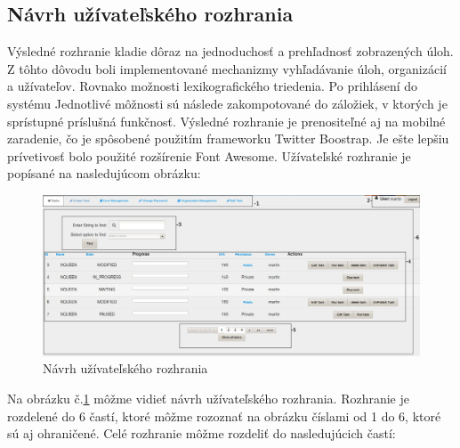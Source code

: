\subsection{Návrh užívateľského rozhrania}
Výsledné rozhranie kladie dôraz na jednoduchosť a prehľadnosť zobrazených úloh. Z tôhto dôvodu boli implementované mechanizmy vyhľadávanie úloh, organizácií a užívateľov. Rovnako možnosti lexikografického triedenia. Po prihlásení do systému Jednotlivé môžnosti sú následe zakompotované do záložiek, v ktorých je sprístupné príslušná funkčnosť. Výsledné rozhranie je prenositeľné aj na mobilné zaradenie, čo je spôsobené použitím frameworku Twitter Boostrap. Je ešte lepšiu prívetivosť bolo použité rozšírenie Font Awesome. Užívateľské rozhranie je popísané na nasledujúcom obrázku:
\begin{figure}[htb]

\begin{center}

\includegraphics[scale=0.5]{page_show.jpg} 
\caption{Návrh užívateľského rozhrania}
\label{rozhranie}

\end{center}

\end{figure}
Na obrázku č.\ref{rozhranie} môžme vidieť návrh užívateľského rozhrania. Rozhranie je rozdelené do 6 častí, ktoré môžme rozoznať na obrázku číslami od 1 do 6, ktoré sú aj ohraničené. Celé rozhranie môžme rozdeliť do nasledujúcich častí:
